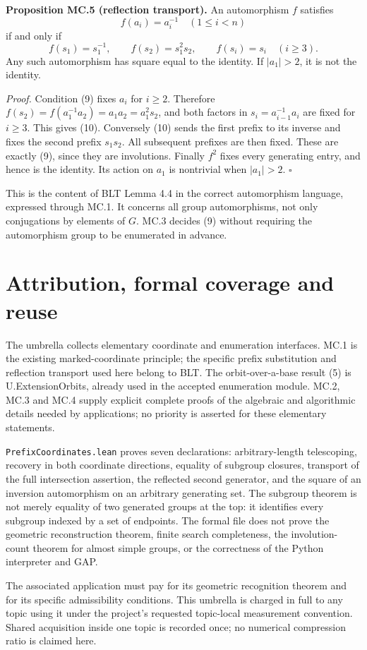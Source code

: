 \documentclass[11pt]{article}
\begin{document}
\textbf{Proposition MC.5 (reflection transport).} An automorphism \(f\)
satisfies \[
f(a_i)=a_i^{-1}\quad(1\leq i<n)
\tag{9}
\] if and only if \[
f(s_1)=s_1^{-1},\qquad f(s_2)=s_1^2s_2,
\qquad f(s_i)=s_i\quad(i\geq3).
\tag{10}
\] Any such automorphism has square equal to the identity. If
\(|a_1|>2\), it is not the identity.

\emph{Proof.} Condition (9) fixes \(a_i\) for \(i\geq2\). Therefore
\(f(s_2)=f(a_1^{-1}a_2)=a_1a_2=a_1^2s_2\), and both factors in
\(s_i=a_{i-1}^{-1}a_i\) are fixed for \(i\geq3\). This gives (10).
Conversely (10) sends the first prefix to its inverse and fixes the
second prefix \(s_1s_2\). All subsequent prefixes are then fixed. These
are exactly (9), since they are involutions. Finally \(f^2\) fixes every
generating entry, and hence is the identity. Its action on \(a_1\) is
nontrivial when \(|a_1|>2\). \(\square\)

This is the content of BLT Lemma 4.4 in the correct automorphism
language, expressed through MC.1. It concerns all group automorphisms,
not only conjugations by elements of \(G\). MC.3 decides (9) without
requiring the automorphism group to be enumerated in advance.

\section{Attribution, formal coverage and
reuse}\label{attribution-formal-coverage-and-reuse}

The umbrella collects elementary coordinate and enumeration interfaces.
MC.1 is the existing marked-coordinate principle; the specific prefix
substitution and reflection transport used here belong to BLT. The
orbit-over-a-base result (5) is U.ExtensionOrbits, already used in the
accepted enumeration module. MC.2, MC.3 and MC.4 supply explicit
complete proofs of the algebraic and algorithmic details needed by
applications; no priority is asserted for these elementary statements.

\texttt{PrefixCoordinates.lean} proves seven declarations:
arbitrary-length telescoping, recovery in both coordinate directions,
equality of subgroup closures, transport of the full intersection
assertion, the reflected second generator, and the square of an
inversion automorphism on an arbitrary generating set. The subgroup
theorem is not merely equality of two generated groups at the top: it
identifies every subgroup indexed by a set of endpoints. The formal file
does not prove the geometric reconstruction theorem, finite search
completeness, the involution-count theorem for almost simple groups, or
the correctness of the Python interpreter and GAP.

The associated application must pay for its geometric recognition
theorem and for its specific admissibility conditions. This umbrella is
charged in full to any topic using it under the project's requested
topic-local measurement convention. Shared acquisition inside one topic
is recorded once; no numerical compression ratio is claimed here.
\end{document}

